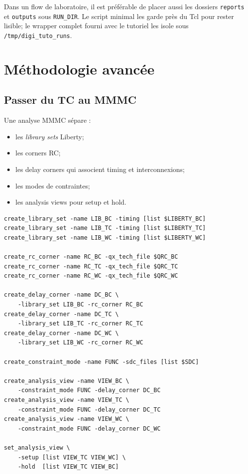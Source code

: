 \documentclass[11pt,a4paper,openany]{report}
\begin{document}
\begin{keybox}
Dans un flow de laboratoire, il est préférable de placer aussi les dossiers
\texttt{reports} et \texttt{outputs} sous \texttt{RUN\_DIR}. Le script minimal
les garde près du Tcl pour rester lisible; le wrapper complet fourni avec le
tutoriel les isole sous \texttt{/tmp/digi\_tuto\_runs}.
\end{keybox}

\chapter{Méthodologie avancée}

\section{Passer du TC au MMMC}

Une analyse MMMC sépare :

\begin{itemize}
  \item les \emph{library sets} Liberty;
  \item les corners RC;
  \item les delay corners qui associent timing et interconnexions;
  \item les modes de contraintes;
  \item les analysis views pour setup et hold.
\end{itemize}

\begin{lstlisting}[style=guidecode,language=TclGuide,
caption={Structure MMMC simplifiée}]
create_library_set -name LIB_BC -timing [list $LIBERTY_BC]
create_library_set -name LIB_TC -timing [list $LIBERTY_TC]
create_library_set -name LIB_WC -timing [list $LIBERTY_WC]

create_rc_corner -name RC_BC -qx_tech_file $QRC_BC
create_rc_corner -name RC_TC -qx_tech_file $QRC_TC
create_rc_corner -name RC_WC -qx_tech_file $QRC_WC

create_delay_corner -name DC_BC \
    -library_set LIB_BC -rc_corner RC_BC
create_delay_corner -name DC_TC \
    -library_set LIB_TC -rc_corner RC_TC
create_delay_corner -name DC_WC \
    -library_set LIB_WC -rc_corner RC_WC

create_constraint_mode -name FUNC -sdc_files [list $SDC]

create_analysis_view -name VIEW_BC \
    -constraint_mode FUNC -delay_corner DC_BC
create_analysis_view -name VIEW_TC \
    -constraint_mode FUNC -delay_corner DC_TC
create_analysis_view -name VIEW_WC \
    -constraint_mode FUNC -delay_corner DC_WC

set_analysis_view \
    -setup [list VIEW_TC VIEW_WC] \
    -hold  [list VIEW_TC VIEW_BC]
\end{lstlisting}
\end{document}
